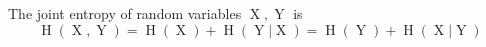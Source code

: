 The joint entropy of random variables $\operatorname{X},\operatorname{Y}$ is
$$\operatorname{H}(\operatorname{X}, \operatorname{Y}) = \operatorname{H}(\operatorname{X}) + \operatorname{H}(\operatorname{Y} | \operatorname{X}) = \operatorname{H}(\operatorname{Y}) + \operatorname{H}(\operatorname{X} |\operatorname{Y})$$
